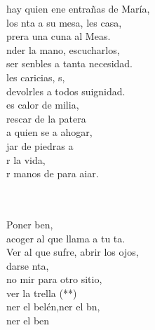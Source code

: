 \documentclass[12pt]{article}
\begin{document}
\begin{multicols*}{2}
\begin{cancion}
	hay quien ene entrañas de María,\\
	los nta a su mesa, les casa,\\
	prera una cuna al Meas. \\
\jump
	nder la mano, escucharlos,\\
	ser senbles a tanta necesidad.\\
	les caricias, s,\\
	devolrles a todos suignidad.\\
\jump
	es calor de milia,\\
	rescar de la patera \\
	a quien se  a ahogar,\\
	jar de  piedras a\\
	r la vida,\\
	r manos de  para aiar.\\\jump\\
	\begin{chorus}%
	     \\
	Poner ben, \\
	acoger al que llama a tu ta.\\
Ver al que sufre, abrir los ojos,\\
	darse nta,\\
	no mir para otro sitio, \\
	ver la trella (**)\\
	ner el belén,ner el bn,\\
	ner el ben   \\
	\end{chorus}%
	\jump\\
\end{cancion}%


\end{multicols*}
\end{document}
